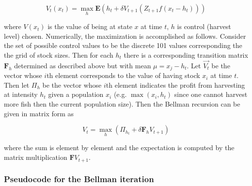\documentclass[author-year, review]{elsarticle} %
\newenvironment{Shaded}{}{}
\newcommand{\KeywordTok}[1]{\textcolor[rgb]{0.00,0.44,0.13}{\textbf{{#1}}}}
\newcommand{\DataTypeTok}[1]{\textcolor[rgb]{0.56,0.13,0.00}{{#1}}}
\newcommand{\DecValTok}[1]{\textcolor[rgb]{0.25,0.63,0.44}{{#1}}}
\newcommand{\StringTok}[1]{\textcolor[rgb]{0.25,0.44,0.63}{{#1}}}
\newcommand{\CommentTok}[1]{\textcolor[rgb]{0.38,0.63,0.69}{\textit{{#1}}}}
\newcommand{\NormalTok}[1]{{#1}}
\begin{document}
\begin{equation}
V_t(x_t) = \max_h \mathbf{E} \left( h_t + \delta V_{t+1}( Z_{t+1} f(x_t - h_t)) \right)
\end{equation}

where $V(x_t)$ is the value of being at state $x$ at time $t$, $h$ is
control (harvest level) chosen. Numerically, the maximization is
accomplished as follows. Consider the set of possible control values to
be the discrete 101 values corresponding the the grid of stock sizes.
Then for each $h_t$ there is a corresponding transition matrix
$\mathbf{F}_h$ determined as described above but with mean
$\mu = x_j - h_t$. Let $\vec{V_t}$ be the vector whose $i$th element
corresponds to the value of having stock $x_i$ at time $t$. Then let
$\Pi_h$ be the vector whose $i$th element indicates the profit from
harvesting at intensity $h_t$ given a population $x_i$ (e.g.
$\max(x_i, h_t)$ since one cannot harvest more fish then the current
population size). Then the Bellman recursion can be given in matrix form
as

\[V_{t} = \max_h \left( \Pi_{h_{t}} + \delta \mathbf{F}_h V_{t+1} \right)\]

where the sum is element by element and the expectation is computed by
the matrix multiplication $\mathbf{F} V_{t+1}$.

\subsubsection{Pseudocode for the Bellman iteration}

\begin{Shaded}
\end{Shaded}
\end{document}
